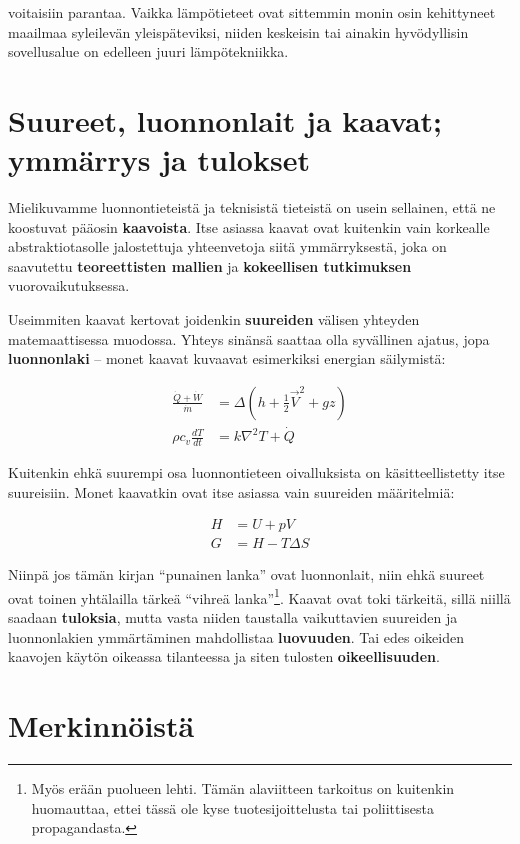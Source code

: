 \documentclass[12pt,a4paper,finnish]{book}
\begin{document}
voitaisiin parantaa. Vaikka lämpötieteet ovat sittemmin monin osin kehittyneet maailmaa syleilevän yleispäteviksi, 
niiden keskeisin tai ainakin hyvödyllisin sovellusalue on edelleen juuri lämpötekniikka.

\section{Suureet, luonnonlait ja kaavat; ymmärrys ja tulokset} %

Mielikuvamme luonnontieteistä ja teknisistä tieteistä on usein sellainen, että ne koostuvat pääosin \textbf{kaavoista}. 
Itse asiassa kaavat ovat kuitenkin vain korkealle abstraktiotasolle jalostettuja yhteenvetoja siitä ymmärryksestä, 
joka on saavutettu \textbf{teoreettisten mallien} ja \textbf{kokeellisen tutkimuksen} vuorovaikutuksessa.

Useimmiten kaavat kertovat joidenkin \textbf{suureiden} välisen yhteyden matemaattisessa muodossa. Yhteys sinänsä 
saattaa olla syvällinen ajatus, jopa \textbf{luonnonlaki} -- monet kaavat kuvaavat esimerkiksi energian säilymistä:

\begin{align}
 \frac{\dot{Q} + \dot{W}}{\dot{m}} &= \Delta\left(h + \frac{1}{2}\vec{V}^2 + gz\right)\\
 \rho c_v\frac{dT}{dt} &= k\nabla^2T + \dot{Q}
\end{align}

Kuitenkin ehkä suurempi osa luonnontieteen oivalluksista on käsitteellistetty itse suureisiin. Monet kaavatkin 
ovat itse asiassa vain suureiden määritelmiä:

\begin{align}
 H &= U + pV\\
 G &= H - T\Delta S 
\end{align}

Niinpä jos tämän kirjan ``punainen lanka'' ovat luonnonlait, niin ehkä suureet ovat toinen yhtälailla tärkeä
``vihreä lanka''\footnote{Myös erään puolueen lehti. Tämän alaviitteen tarkoitus on kuitenkin huomauttaa, 
ettei tässä ole kyse tuotesijoittelusta tai poliittisesta propagandasta.}. Kaavat ovat toki tärkeitä, sillä 
niillä saadaan \textbf{tuloksia}, mutta vasta niiden taustalla vaikuttavien suureiden ja luonnonlakien 
ymmärtäminen mahdollistaa \textbf{luovuuden}. Tai edes oikeiden kaavojen käytön oikeassa tilanteessa ja siten 
tulosten \textbf{oikeellisuuden}.

\section{Merkinnöistä} %
\end{document}
